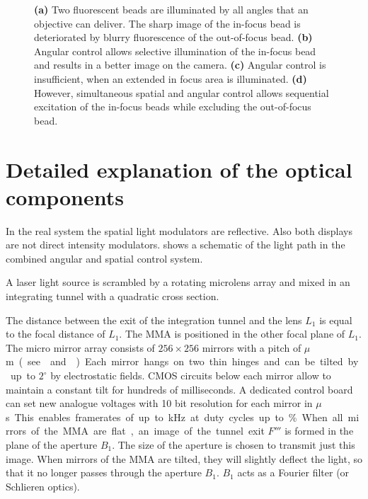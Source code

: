 \begin{figure}[!hbt]
  \centering
  \def\svgscale{.43}
  
  \caption{{\bf (a)} Two fluorescent beads are illuminated by all
    angles that an objective can deliver. The sharp image of the
    in-focus bead is deteriorated by blurry fluorescence of the
    out-of-focus bead. {\bf (b)} Angular control allows selective
    illumination of the in-focus bead and results in a better image on
    the camera. {\bf (c)} Angular control is insufficient, when an
    extended in focus area is illuminated. {\bf (d)} However,
    simultaneous spatial and angular control allows sequential
    excitation of the in-focus beads while excluding the out-of-focus
    bead.}
  \label{fig:hourglass-all}
\end{figure}
\newpage
\section{Detailed explanation of the optical components}

In the real system the spatial light modulators are reflective. 
Also both displays are not direct intensity modulators.
 shows a schematic of the light path in
the combined angular and spatial control system.

A laser light source is scrambled by a rotating microlens array and
mixed in an integrating tunnel with a quadratic cross section.

The distance between the exit of the integration tunnel and the lens
$L_1$ is equal to the focal distance of $L_1$. The MMA is positioned
in the other focal plane of $L_1$. The micro mirror array
\citep{Berndt} consists of $256\times 256$ mirrors with a pitch of
\unit[16]{$\mu$m} (see  and
). Each mirror hangs on two thin hinges and
can be tilted by up to $2^\circ$ by electrostatic fields. CMOS
circuits below each mirror allow to maintain a constant tilt for
hundreds of milliseconds. A dedicated control board can set new
analogue voltages with 10 bit resolution for each mirror in
\unit[850]{$\mu$s}. This enables framerates of up to \unit[1]{kHz} at
duty cycles up to \unit[50]{\%}.

When all mirrors of the MMA are flat, an image of the tunnel exit $F'''$
is formed in the plane of the aperture $B_1$. The size of the aperture
is chosen to transmit just this image. When mirrors of the MMA are
tilted, they will slightly deflect the light, so that it no longer
passes through the aperture $B_1$. $B_1$ acts as a Fourier filter (or
Schlieren optics).

